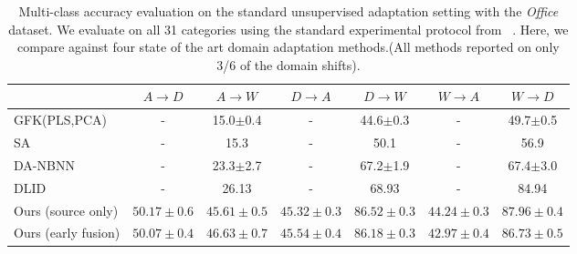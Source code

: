 \begin{table*}
  \setlength{\tabcolsep}{4pt}
  \scriptsize
\centering
\begin{tabular}{lcccccc}
\toprule
                     & $A \rightarrow D$   & $A \rightarrow W$   & $D \rightarrow A$   & $D \rightarrow W$   & $W \rightarrow A$   & $W \rightarrow D$   \\
\midrule
GFK(PLS,PCA)~\cite{gong-cvpr12} & - & 15.0$\pm$0.4 & - & 44.6$\pm$0.3 & - & 49.7$\pm$0.5\\
SA~\cite{fernando-iccv13} & - & 15.3 & - & 50.1& - & 56.9\\
DA-NBNN~\cite{da-nbnn} & - & 23.3$\pm$2.7 & - & 67.2$\pm$1.9 & - & 67.4$\pm$3.0\\
DLID~\cite{ref:dlid} & - & 26.13 & - & 68.93 & - & 84.94\\                     
\midrule
 Ours (source only)   & $\bm{50.17 \pm 0.6}$     & $45.61 \pm 0.5$     & $45.32 \pm 0.3$     & $\bm{86.52 \pm 0.3}$     & $\bm{44.24 \pm 0.3}$     & $\bm{87.96 \pm 0.4}$     \\
Ours (early fusion)   & $50.07 \pm 0.4$     & $\bm{46.63 \pm 0.7}$     & $\bm{45.54 \pm 0.4}$     & $86.18 \pm 0.3$     & $42.97 \pm 0.4$     & $86.73 \pm 0.5$     \\
\bottomrule
\end{tabular}

\caption{Multi-class accuracy evaluation on the standard unsupervised adaptation setting with the \emph{Office} dataset. We evaluate on all 31 categories using the standard experimental protocol from ~\cite{gong-cvpr12}. Here, we compare against four state of the art domain adaptation methods.(All methods reported on only 3/6 of the domain shifts).}
\label{table:full-unsuper}
\end{table*}

